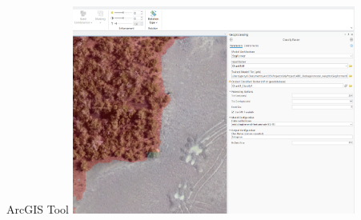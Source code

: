 




\begin{frame}{ArcGIS Tool}
    \centering
    \includegraphics[height=0.7\textheight,width=0.7\textwidth,keepaspectratio]{images/arcgis.png}
\end{frame}

